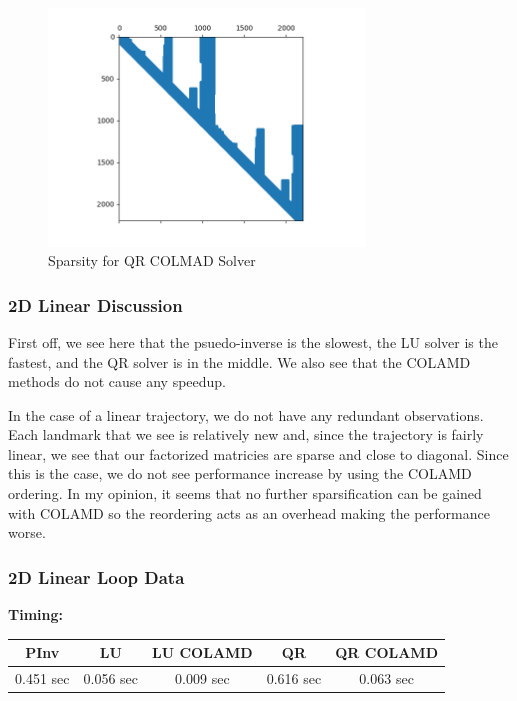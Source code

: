 \documentclass[12pt, a4paper]{article}
\begin{document}
\begin{figure}
    \center
    \includegraphics[width=0.75\textwidth]{linear_results/QR_COLAMD_Sparsity.png}
    \caption{Sparsity for QR COLMAD Solver}
\end{figure}

\clearpage
\subsubsection{2D Linear Discussion}
First off, we see here that the psuedo-inverse is the slowest, the LU solver is the fastest, and the QR solver is in the middle. We also see that the COLAMD methods do not cause any speedup.

In the case of a linear trajectory, we do not have any redundant observations. Each landmark that we see is relatively new and, since the trajectory is fairly linear, we see that our factorized matricies are sparse and close to diagonal. Since this is the case, we do not see performance increase by using the COLAMD ordering. In my opinion, it seems that no further sparsification can be gained with COLAMD so the reordering acts as an overhead making the performance worse.

\clearpage
\subsubsection{2D Linear Loop Data}
\textbf{Timing:}

\begin{tabular}{|c | c | c | c | c|}
    \hline
    \textbf{PInv} & \textbf{LU} & \textbf{LU COLAMD} & \textbf{QR} & \textbf{QR COLAMD} \\
    \hline
    \hline
    0.451 sec & 0.056 sec & 0.009 sec & 0.616 sec & 0.063 sec \\
    \hline
\end{tabular}
\end{document}
